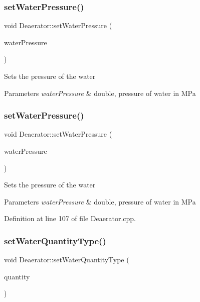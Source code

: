 \subsubsection{\texorpdfstring{set\+Water\+Pressure()}{setWaterPressure()}\hspace{0.1cm}{\footnotesize\ttfamily [2/3]}}
{\footnotesize\ttfamily void Deaerator\+::set\+Water\+Pressure (\begin{DoxyParamCaption}\item[{double}]{water\+Pressure }\end{DoxyParamCaption})}

Sets the pressure of the water 
\begin{DoxyParams}{Parameters}
{\em water\+Pressure} & double, pressure of water in M\+Pa \\
\hline
\end{DoxyParams}
\mbox{\label{class_deaerator_ae23f64c6983daed388a73c033a15e176}} 
\subsubsection{\texorpdfstring{set\+Water\+Pressure()}{setWaterPressure()}\hspace{0.1cm}{\footnotesize\ttfamily [3/3]}}
{\footnotesize\ttfamily void Deaerator\+::set\+Water\+Pressure (\begin{DoxyParamCaption}\item[{double}]{water\+Pressure }\end{DoxyParamCaption})}

Sets the pressure of the water 
\begin{DoxyParams}{Parameters}
{\em water\+Pressure} & double, pressure of water in M\+Pa \\
\hline
\end{DoxyParams}


Definition at line 107 of file Deaerator.\+cpp.

\mbox{\label{class_deaerator_ac60ad3d6650ed6c7783d18833bb7e3dd}} 
\subsubsection{\texorpdfstring{set\+Water\+Quantity\+Type()}{setWaterQuantityType()}\hspace{0.1cm}{\footnotesize\ttfamily [1/3]}}
{\footnotesize\ttfamily void Deaerator\+::set\+Water\+Quantity\+Type (\begin{DoxyParamCaption}\item[{\hyperlink{class_steam_properties_ae0294bedf7d178c2d8fb6aed0f62fbff}{Steam\+Properties\+::\+Thermodynamic\+Quantity}}]{quantity }\end{DoxyParamCaption})}

